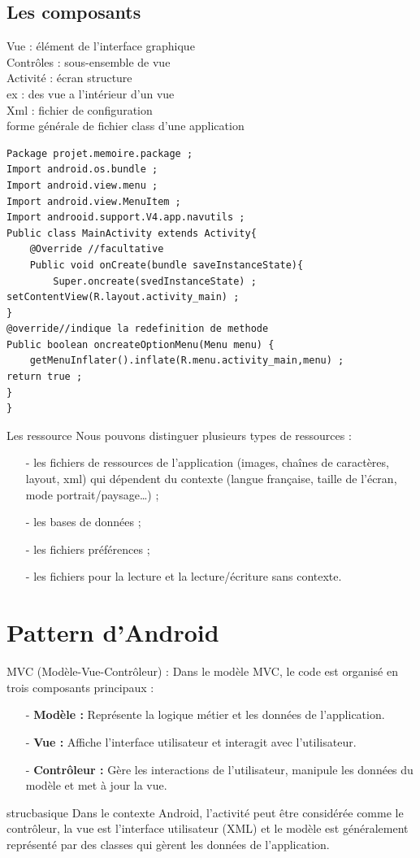 \subsection{Les composants}
Vue : élément de l’interface graphique\\ 
Contrôles : sous-ensemble de vue\\
Activité : écran structure \\
	ex : des vue a l’intérieur d’un vue\\
Xml : fichier de configuration \\
forme générale de fichier class d'une application
\begin{lstlisting}
Package projet.memoire.package ;
Import android.os.bundle ;
Import android.view.menu ;
Import android.view.MenuItem ;
Import androoid.support.V4.app.navutils ;
Public class MainActivity extends Activity{
	@Override //facultative
	Public void onCreate(bundle saveInstanceState){
		Super.oncreate(svedInstanceState) ;
setContentView(R.layout.activity_main) ;
}
@override//indique la redefinition de methode
Public boolean oncreateOptionMenu(Menu menu) {
	getMenuInflater().inflate(R.menu.activity_main,menu) ;
return true ;
}
}
\end{lstlisting}
Les ressource
Nous pouvons distinguer plusieurs types de ressources :
\begin{itemize}
\item[-]les fichiers de ressources de l'application (images, chaînes de caractères, layout, xml) qui dépendent du contexte (langue française, taille de l'écran, mode portrait/paysage…) ;
\item[-]les bases de données ;
\item[-]les fichiers préférences ;
\item[-]les fichiers pour la lecture et la lecture/écriture sans contexte.
\end{itemize}
\section{Pattern d'Android }
MVC (Modèle-Vue-Contrôleur) : Dans le modèle MVC, le code est organisé en trois composants principaux :
\begin{itemize}
    \item[-]\textbf{Modèle :} Représente la logique métier et les données de l'application.
    \item[-]\textbf{Vue : }Affiche l'interface utilisateur et interagit avec l'utilisateur.
    \item[-]\textbf{Contrôleur : } Gère les interactions de l'utilisateur, manipule les données du modèle et met à jour la vue.
\end{itemize}strucbasique
Dans le contexte Android, l'activité peut être considérée comme le contrôleur, la vue est l'interface utilisateur (XML) et le modèle est généralement représenté par des classes qui gèrent les données de l'application.

